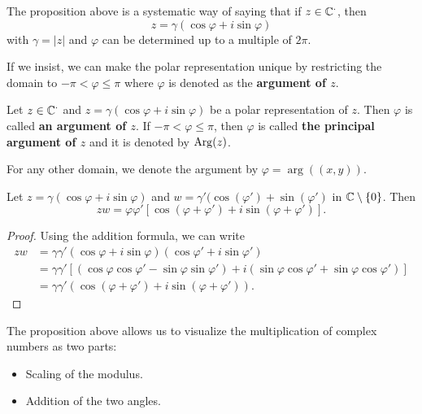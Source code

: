 \documentclass[a4paper]{report}
\begin{document}
\begin{remark}
The proposition above is a systematic way of saying that if \( z \in \mathbb{C}^{\cdot} \), then     
\[  z = \gamma (\cos \varphi + i \sin \varphi ) \]
with \( \gamma = | z  |  \) and \( \varphi  \) can be determined up to a multiple of \( 2 \pi \).
\end{remark}

If we insist, we can make the polar representation unique by restricting the domain to \( -\pi < \varphi \leq \pi \) where \( \varphi  \) is denoted as the \textbf{argument of \( z  \)}.

\begin{definition}
    Let \( z \in \mathbb{C}^{\cdot} \) and \( z = \gamma (\cos \varphi + i \sin \varphi) \) be a polar representation of \( z  \). Then \( \varphi  \) is called \textbf{an argument of \( z  \)}. If \( - \pi < \varphi \leq \pi \), then \( \varphi  \) is called \textbf{the principal argument of \( z \)} and it is denoted by \( \operatorname{Arg}(z) \). 
\end{definition}
\begin{remark}
    For any other domain, we denote the argument by \( \varphi = \arg((x,y)) \).
\end{remark}

\begin{lemma}
    Let \( z = \gamma(\cos \varphi + i \sin \varphi) \) and \( w = \gamma' (\cos(\varphi') + \sin(\varphi') \) in \( \mathbb{C} \setminus  \{ 0  \}  \). Then
    \[  zw = \varphi \varphi' [\cos(\varphi + \varphi') + i \sin(\varphi + \varphi')]. \]
\end{lemma}
\begin{proof}
Using the addition formula, we can write
\begin{align*}
    zw &= \gamma \gamma'  (\cos \varphi + i \sin \varphi)(\cos \varphi' + i \sin \varphi')  \\
       &= \gamma \gamma' [ (\cos \varphi \cos \varphi' - \sin \varphi \sin \varphi') + i(\sin \varphi \cos \varphi' + \sin \varphi \cos \varphi') ] \\
       &= \gamma \gamma' (\cos(\varphi + \varphi') + i \sin(\varphi + \varphi')).
\end{align*}
\end{proof}

The proposition above allows us to visualize the multiplication of complex numbers as two parts:
    \begin{itemize}
        \item Scaling of the modulus.
        \item Addition of the two angles.
    \end{itemize}
\end{document}
